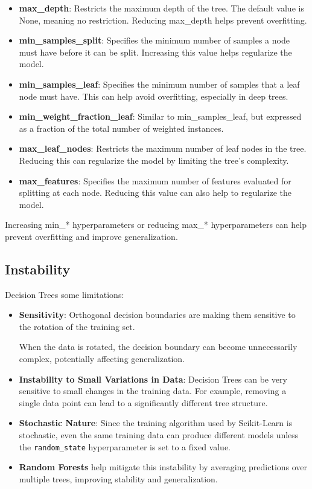 \documentclass{article}
\begin{document}
\begin{itemize}
    \item \textbf{max\_depth}: Restricts the maximum depth of the tree. The default value is None, meaning no restriction. Reducing max\_depth helps prevent overfitting.
    \item \textbf{min\_samples\_split}: Specifies the minimum number of samples a node must have before it can be split. Increasing this value helps regularize the model.
    \item \textbf{min\_samples\_leaf}: Specifies the minimum number of samples that a leaf node must have. This can help avoid overfitting, especially in deep trees.
    \item \textbf{min\_weight\_fraction\_leaf}: Similar to min\_samples\_leaf, but expressed as a fraction of the total number of weighted instances.
    \item \textbf{max\_leaf\_nodes}: Restricts the maximum number of leaf nodes in the tree. Reducing this can regularize the model by limiting the tree's complexity.
    \item \textbf{max\_features}: Specifies the maximum number of features evaluated for splitting at each node. Reducing this value can also help to regularize the model.
\end{itemize}
Increasing min\_* hyperparameters or reducing max\_* hyperparameters can help prevent overfitting and improve generalization.


\subsection*{Instability}
Decision Trees some limitations:

\begin{itemize}
  \item \textbf{Sensitivity}: Orthogonal decision boundaries are  making them sensitive to the rotation of the training set.

When the data is rotated, the decision boundary can become unnecessarily complex, potentially affecting generalization.
    \item \textbf{Instability to Small Variations in Data}: Decision Trees can be very sensitive to small changes in the training data. For example, removing a single data point can lead to a significantly different tree structure.
    \item \textbf{Stochastic Nature}: Since the training algorithm used by Scikit-Learn is stochastic, even the same training data can produce different models unless the \texttt{random\_state} hyperparameter is set to a fixed value.
\item \textbf{Random Forests} help mitigate this instability by averaging predictions over multiple trees, improving stability and generalization.

\end{itemize}
\end{document}
